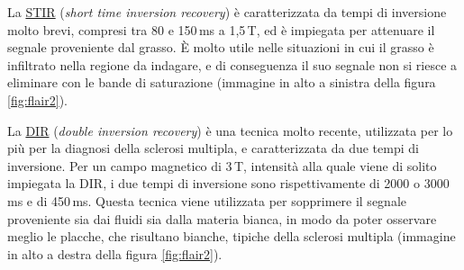 \documentclass{report}
\newcommand{\figref}[1]{figura \ref{#1}}
\numberwithin{equation}{section}
\numberwithin{figure}{section}
\begin{document}
La \underline{STIR} (\textit{short time inversion recovery}) è caratterizzata da tempi di inversione molto brevi, compresi tra 80 e 150\,ms a 1,5\,T, ed è impiegata per attenuare il segnale proveniente dal grasso. È molto utile nelle situazioni in cui il grasso è infiltrato nella regione da indagare, e di conseguenza il suo segnale non si riesce a eliminare con le bande di saturazione (immagine in alto a sinistra della \figref{fig:flair2}).

La \underline{DIR} (\textit{double inversion recovery}) è una tecnica molto recente, utilizzata per lo più per la diagnosi della sclerosi multipla, e caratterizzata da due tempi di inversione. Per un campo magnetico di 3\,T, intensità alla quale viene di solito impiegata la DIR, i due tempi di inversione sono rispettivamente di 2000 o 3000\,ms e di 450\,ms. Questa tecnica viene utilizzata per sopprimere il segnale proveniente sia dai fluidi sia dalla materia bianca, in modo da poter osservare meglio le placche, che risultano bianche, tipiche della sclerosi multipla (immagine in alto a destra della \figref{fig:flair2}).
\end{document}
